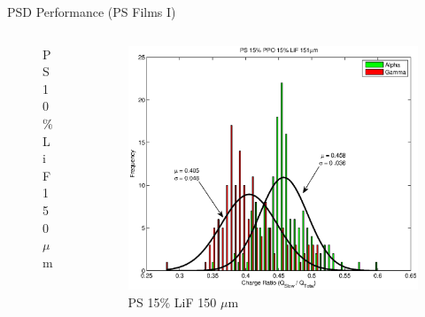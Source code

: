 \begin{frame}{PSD Performance (PS Films I)}
\begin{columns}[onlytextwidth]
\begin{column}{0.30\textwidth}
\begin{figure}
		\caption{PS 10\% LiF 150 $\mu$m}
	\end{figure}
\end{column}
\begin{column}{0.30\textwidth}
	\tiny
	\begin{figure}
		\centering
		\includegraphics[width=\textwidth]{images/ChargeIntegration_PS_LiF15_POP_151um.eps}
		\caption{PS 15\% LiF 150 $\mu$m}
	\end{figure}
\end{column}
\end{columns}
\end{frame}
